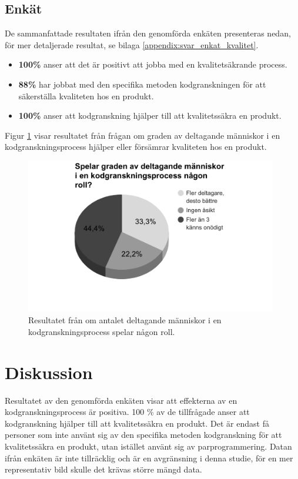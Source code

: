 \subsection{Enkät}
De sammanfattade resultaten ifrån den genomförda enkäten presenteras nedan, för mer detaljerade resultat, se bilaga \ref{appendix:svar_enkat_kvalitet}.
\begin{itemize}
	\item \textbf{100\%} anser att det är positivt att jobba med en kvalitetsäkrande process.
	\item \textbf{88\%} har jobbat med den specifika metoden kodgranskningen för att säkerställa kvaliteten hos en produkt.
	\item \textbf{100\%} anser att kodgranskning hjälper till att kvalitetssäkra en produkt.
\end{itemize}
Figur \ref{fig:grade_participation} visar resultatet från frågan om graden av deltagande människor i en kodgranskningsprocess hjälper eller försämrar kvaliteten hos en produkt.

\begin{figure}[H]
	\centering
	\includegraphics[width=110mm]{figures/grade_participation.png}
	\caption{Resultatet från om antalet deltagande människor i en kodgranskningsprocess spelar någon roll.}
	\label{fig:grade_participation}
\end{figure}

\section{Diskussion}
\label{sec:discussion-wallstrom}
Resultatet av den genomförda enkäten visar att effekterna av en kodgranskningsprocess är positiva. 100 \% av de tillfrågade anser att kodgranskning hjälper till att kvalitetssäkra en produkt. Det är endast få personer som inte använt sig av den specifika metoden kodgranskning för att kvalitetssäkra en produkt, utan istället använt sig av parprogrammering. Datan ifrån enkäten är inte tillräcklig och är en avgränsning i denna studie, för en mer representativ bild skulle det krävas större mängd data. 

